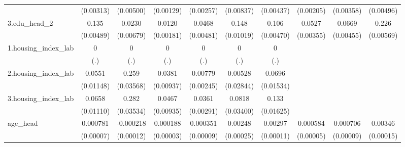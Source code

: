 \begin{table}[htbp]
\begin{tabular}{l*{9}{c}}
            &   (0.00313)         &   (0.00500)         &   (0.00129)         &   (0.00257)         &   (0.00837)         &   (0.00437)         &   (0.00205)         &   (0.00358)         &   (0.00496)         \\
3.edu\_head\_2&       0.135\sym{***}&      0.0230\sym{***}&      0.0120\sym{***}&      0.0468\sym{***}&       0.148\sym{***}&       0.106\sym{***}&      0.0527\sym{***}&      0.0669\sym{***}&       0.226\sym{***}\\
            &   (0.00489)         &   (0.00679)         &   (0.00181)         &   (0.00481)         &   (0.01019)         &   (0.00470)         &   (0.00355)         &   (0.00455)         &   (0.00569)         \\
1.housing\_index\_lab&           0         &           0         &           0         &           0         &           0         &           0         &                     &                     &                     \\
            &         (.)         &         (.)         &         (.)         &         (.)         &         (.)         &         (.)         &                     &                     &                     \\
2.housing\_index\_lab&      0.0551\sym{***}&       0.259\sym{***}&      0.0381\sym{***}&     0.00779\sym{***}&     0.00528         &      0.0696\sym{***}&                     &                     &                     \\
            &   (0.01148)         &   (0.03568)         &   (0.00937)         &   (0.00245)         &   (0.02844)         &   (0.01534)         &                     &                     &                     \\
3.housing\_index\_lab&      0.0658\sym{***}&       0.282\sym{***}&      0.0467\sym{***}&      0.0361\sym{***}&      0.0818\sym{**} &       0.133\sym{***}&                     &                     &                     \\
            &   (0.01110)         &   (0.03534)         &   (0.00935)         &   (0.00291)         &   (0.03400)         &   (0.01625)         &                     &                     &                     \\
age\_head    &    0.000781\sym{***}&   -0.000218\sym{*}  &    0.000188\sym{***}&    0.000351\sym{***}&     0.00248\sym{***}&     0.00297\sym{***}&    0.000584\sym{***}&    0.000706\sym{***}&     0.00346\sym{***}\\
            &   (0.00007)         &   (0.00012)         &   (0.00003)         &   (0.00009)         &   (0.00025)         &   (0.00011)         &   (0.00005)         &   (0.00009)         &   (0.00015)         \\

\end{tabular}
\end{table}
